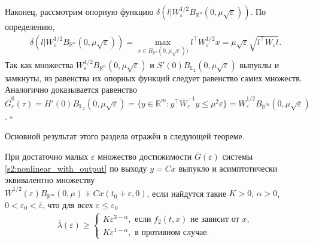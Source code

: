 \documentclass[../main.tex]{subfiles}
\begin{document}
Наконец, рассмотрим опорную функцию $\delta(l | W^{1/2}_{\varepsilon} B_{\mathbb{R}^n}(0,\mu\sqrt{\varepsilon}))$.
По определению,
\begin{gather*}
	\delta(l | W^{1/2}_{\varepsilon} B_{\mathbb{R}^n}(0,\mu\sqrt{\varepsilon})) = \max\limits_{x \in B_{\mathbb{R}^n}(0,\mu\sqrt{\varepsilon}))} l^{\top} W^{1/2}_{\varepsilon} x = \mu\sqrt{\varepsilon} \sqrt{l^{\top} W_{\varepsilon} l}.
\end{gather*}
Так как множества $W^{1/2}_{\varepsilon} B_{\mathbb{R}^n}(0,\mu\sqrt{\varepsilon}) $ и $S'(0) B_{\mathbb{L}_2}(0,\mu\sqrt{\varepsilon})$ выпуклы и замкнуты, из равенства их опорных функций следует равенство самих множеств. 
Аналогично доказывается равенство $\overline{G}^0_{\varepsilon}(\tau) = H'(0) B_{\mathbb{L}_2}(0,\mu\sqrt{\varepsilon}) = \{ y \in \mathbb{R}^m: y^{\top} \overline{W}^{-1}_{\varepsilon} y \leqslant \mu^2 \varepsilon \} = \overline{W}^{1/2}_{\varepsilon} B_{\mathbb{R}^m}(0,\mu\sqrt{\varepsilon})$.  \hfill $\square$
 
Основной результат этого раздела отражён в следующей теореме.
\begin{theorem}\label{s2:th:assimptotic_equality}
 При достаточно малых $ \varepsilon $ множество достижимости $ \overline{G}(\varepsilon) $ системы \eqref{s2:nonlinear_with_output} по выходу $ y = C x $ выпукло и асимптотически эквивалентно множеству \\ \mbox{$\overline{W}^{1/2}(\varepsilon)B_{\mathbb{R}^m}(0,\mu) + Cx(t_0+\varepsilon,0)$}, если найдутся такие $ K>0 $, $ \alpha > 0 $, $ 0< \varepsilon_0<\overline{\varepsilon} $, что для всех $ \varepsilon \leqslant \varepsilon_0 $
 \begin{gather}\label{s2:cond1}
 \overline{\lambda}(\varepsilon) \geqslant \left\{ {\begin{array}{*{20}{l}}
 {K\varepsilon ^{3 - \alpha}, \mbox{\ если \ } f_2(t,x) \mbox{\ не зависит от \ } x}, \\
 {K\varepsilon ^{1 - \alpha}}, \mbox{\ в противном случае}.
 \end{array}} \right.
 \end{gather}
\end{theorem}
 
\end{document}
